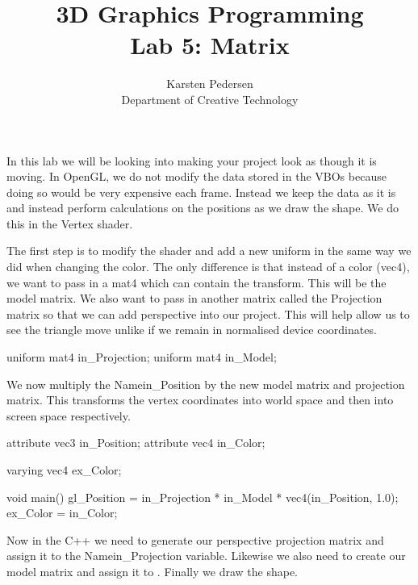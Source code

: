 \documentclass[10pt]{article}
\begin{document}
\title{3D Graphics Programming \\
  \large Lab 5: Matrix}

\author{Karsten Pedersen\\ Department of Creative Technology}
\maketitle

In this lab we will be looking into making your project look as though
it is moving.  In OpenGL, we do not modify the data stored in the VBOs
because doing so would be very expensive each frame. Instead we keep
the data as it is and instead perform calculations on the positions as
we draw the shape.  We do this in the Vertex shader.

The first step is to modify the shader and add a new uniform in the
same way we did when changing the color. The only difference is that
instead of a color (vec4), we want to pass in a mat4 which can contain
the transform.  This will be the model matrix. We also want to pass in
another matrix called the Projection matrix so that we can add perspective
into our project. This will help allow us to see the triangle move unlike
if we remain in normalised device coordinates.

\begin{Code}

uniform mat4 in_Projection;
uniform mat4 in_Model;

\end{Code}

We now multiply the Name{in\_Position} by the new model matrix and projection
matrix.  This transforms the vertex coordinates into world space and
then into screen space respectively.

\begin{Code}

attribute vec3 in_Position;
attribute vec4 in_Color;

varying vec4 ex_Color;

void main()
{
  gl_Position = in_Projection * in_Model * vec4(in_Position, 1.0);
  ex_Color = in_Color;
}

\end{Code}

Now in the C++ we need to generate our perspective projection matrix
and assign it to the Name{in\_Projection} variable.  Likewise we also need to
create our model matrix and assign it to . Finally we draw the shape.
\end{document}
